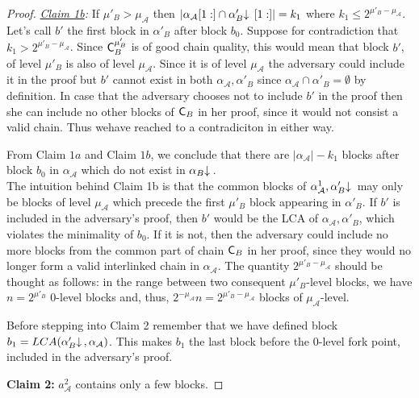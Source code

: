 \begin{proof}
	\noindent
	\textit{\underline{Claim 1b}:} If  $\mu'_B > \mu_\mathcal{A}$ then $\vert \alpha_\mathcal{A}[1:] 
	\cap \alpha'_B\negthickspace\downarrow\,[1:] \vert = k_1$ where $k_1 \leq 2^{\mu'_B - \mu_\mathcal{A}}$.\\
	Let's call $b'$ the first block in $\alpha'_B$ after block $b_0$.
	Suppose for contradiction that $k_1 > 2^{\mu'_B - \mu_\mathcal{A}}$.  Since $\mathsf{C}_B^{\mu'_B}$ is
	of good chain quality, this would mean that block $b'$, of level $\mu'_B$ is also
	of level $\mu_\mathcal{A}$. Since it is of level $\mu_\mathcal{A}$ the adversary could include it in
	the proof but $b'$ cannot exist in both $\alpha_\mathcal{A}, \alpha'_B$ since $\alpha_\mathcal{A}
	\cap \alpha'_B = \emptyset$ by definition. In case that the adversary chooses not
	to include $b'$ in the proof then she can include no other blocks of $\mathsf{C}_B$ in
	her proof, since it would not consist a valid chain. Thus wehave reached to a contradiciton in either way.

	From Claim $1a$ and Claim $1b$, we conclude that there are $\vert \alpha_\mathcal{A}
	\vert - k_1$ blocks after block $b_0$ in $\alpha_\mathcal{A}$ which do not exist in $\alpha_B\negthickspace\downarrow\,$.\\

	The intuition behind Claim 1b is that the common blocks of $\alpha^1_\mathcal{A}, \alpha'_B\negthickspace\downarrow\,$ may only be blocks of level $\mu_\mathcal{A}$ which precede the first $\mu'_B$ block appearing in $\alpha'_B$. If $b'$ is included in the adversary's proof, then $b'$ would be the LCA of $\alpha_\mathcal{A}, \alpha'_B$, which violates the minimality of $b_0$. If it is not, then the adversary could include no more blocks from the common part of chain $\mathsf{C}_B$ in her proof, since they would no longer form a valid interlinked chain in $\alpha_\mathcal{A}$. The quantity $2^{\mu'_B - \mu_\mathcal{A}}$ should be thought as follows: in the range between two consequent $\mu'_B$-level blocks, we have $n = 2^{\mu'_B}$ 0-level blocks and, thus, $2^{-\mu_\mathcal{A}}n = 2^{\mu'_B - \mu_\mathcal{A}}$ blocks of $\mu_\mathcal{A}$-level. 
	
	Before stepping into Claim 2 remember that we have defined block $b_1 = LCA(\alpha'_B \negthickspace\downarrow\,, \alpha_\mathcal{A})$. This makes $b_1$
	the last block before the 0-level fork point, included in the adversary's proof.

	\noindent
	\textbf{Claim 2:} $a^2_\mathcal{A}$ contains only a few blocks.


\end{proof}
